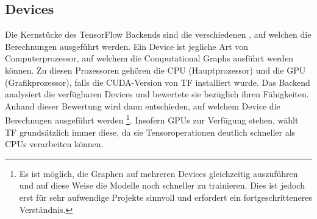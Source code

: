 \begin{appendices}
\section*{Devices}
Die Kernstücke des TensorFlow Backends sind die verschiedenen , auf
welchen die Berechnungen ausgeführt werden. Ein Device ist jegliche Art von
Computerprozessor, auf welchem die Computational Graphs ausführt werden können.
Zu diesen Prozessoren gehören die CPU (Hauptprozessor) und die GPU
(Grafikprozessor), falls die CUDA-Version von TF installiert wurde.
\para{}
Das Backend analysiert die verfügbaren Devices und bewertete sie bezüglich
ihren Fähigkeiten. Anhand dieser Bewertung wird dann entschieden, auf
welchem Device die Berechnugen ausgeführt werden%
\footnote{
  Es ist möglich, die Graphen auf mehreren Devices gleichzeitig auszuführen und
  auf diese Weise die Modelle noch schneller zu trainieren. Dies ist jedoch erst für sehr
  aufwendige Projekte sinnvoll und erfordert ein fortgeschritteneres Verständnis.
}.
Insofern GPUs zur Verfügung stehen, wählt TF grundsätzlich immer diese, da
sie Tensoroperationen deutlich schneller als CPUs verarbeiten können.


\end{appendices}
